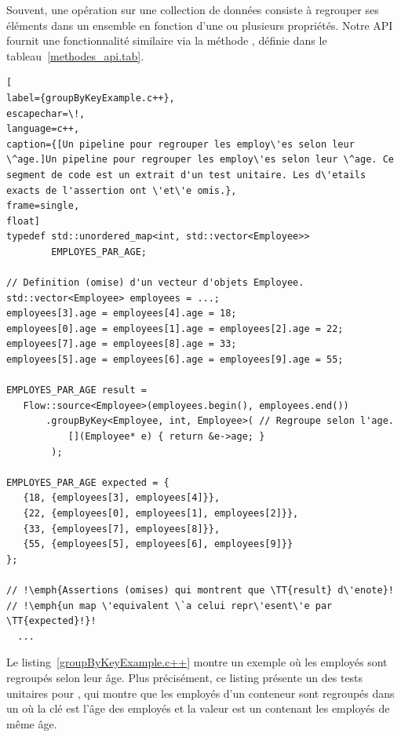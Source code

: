 Souvent, une op\'eration sur une collection de donn\'ees consiste \`a regrouper ses \'el\'ements dans un ensemble en fonction d'une ou plusieurs propri\'et\'es. Notre {API} fournit une fonctionnalit\'e similaire via la m\'ethode , d\'efinie dans le tableau~\ref{methodes_api.tab}. 


\begin{lstlisting}[
label={groupByKeyExample.c++},
escapechar=\!,
language=c++,
caption={[Un pipeline pour regrouper les employ\'es selon leur \^age.]Un pipeline pour regrouper les employ\'es selon leur \^age. Ce segment de code est un extrait d'un test unitaire. Les d\'etails exacts de l'assertion ont \'et\'e omis.},
frame=single,
float]
typedef std::unordered_map<int, std::vector<Employee>> 
        EMPLOYES_PAR_AGE;

// Definition (omise) d'un vecteur d'objets Employee.
std::vector<Employee> employees = ...; 
employees[3].age = employees[4].age = 18;
employees[0].age = employees[1].age = employees[2].age = 22;
employees[7].age = employees[8].age = 33;
employees[5].age = employees[6].age = employees[9].age = 55;

EMPLOYES_PAR_AGE result = 
   Flow::source<Employee>(employees.begin(), employees.end())
       .groupByKey<Employee, int, Employee>( // Regroupe selon l'age.
           [](Employee* e) { return &e->age; } 
        );
    
EMPLOYES_PAR_AGE expected = {
   {18, {employees[3], employees[4]}},
   {22, {employees[0], employees[1], employees[2]}},
   {33, {employees[7], employees[8]}},
   {55, {employees[5], employees[6], employees[9]}}
};

// !\emph{Assertions (omises) qui montrent que \TT{result} d\'enote}!
// !\emph{un map \'equivalent \`a celui repr\'esent\'e par \TT{expected}!}!
  ...
\end{lstlisting}




Le listing~\ref{groupByKeyExample.c++} montre un exemple o\`u les employ\'es sont regroup\'es selon leur \^age. Plus pr\'ecis\'ement, ce listing pr\'esente un des tests unitaires pour , qui montre que les employ\'es d'un conteneur sont regroup\'es dans un  o\`u la cl\'e est l'\^age des employ\'es et la valeur est un  contenant les employ\'es de m\^eme \^age.
%

